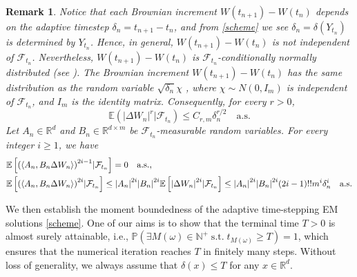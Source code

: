 \documentclass[preprint,12pt,compress]{elsarticle}
\newtheorem{remark}[theorem]{Remark}
\begin{document}
\begin{remark}   \label{remark-steps}
	Notice that each Brownian increment $W({t_{n + 1}}) - W({t_n})$ depends on the adaptive timestep $\delta_n = {t_{n + 1}} - {t_n}$, and from \eqref{scheme} we see ${\delta _n} = {\delta }({Y_{t_n}})$ is determined by $Y_{t_n}$. Hence, in general, $W({t_{n + 1}}) - W({t_n})$ is not independent of $\mathcal{F}_{t_n}$. Nevertheless, $W(t_{n+1}) - W(t_n)$ is $\mathcal{F}_{t_n}$-conditionally normally distributed (see \cite[Remark 2.2]{kelly2018adaptive}). The Brownian increment $W(t_{n+1}) -W(t_n)$ has the same distribution as the random variable $\sqrt{\delta_n} \chi$ \cite{botija2024explicit}, where $\chi  \sim N(0,{I_{m}})$ is independent of $\mathcal{F}_{t_n}$, and $I_{m}$ is the identity matrix. Consequently, for every $r > 0$, 
	\begin{equation*}
		\mathbb{E}\left( {{{\left| {\Delta {W_n}} \right|}^r}|{\mathcal{F}_{{t_n}}}} \right) \le {C_{r,m}}\delta _n^{r/2} \quad \text{a.s.}
	\end{equation*}
	Let $A_n \in \mathbb{R}^{d}$ and $B_n \in \mathbb{R}^{d \times m}$ be $\mathcal{F}_{t_n}$-measurable random variables. For every integer $i \ge 1$, we have
	\begin{equation} \label{kl7}
		\begin{split}
			&\mathbb{E}\left[ {{{\left( {\left\langle {A_n,B_n \Delta {W_n}} \right\rangle } \right)}^{2i - 1}}|{{\cal F}_{{t_n}}}} \right] = 0 \quad \text{a.s.}, \\
			&\mathbb{E}\left[ {{{\left( {\left\langle {A_n,B_n \Delta {W_n}} \right\rangle } \right)}^{2i}}|{{\cal F}_{{t_n}}}} \right] \le {\left| A_n \right|^{2i}}{\left| B_n \right|^{2i}}\mathbb{E}\left[ {{{\left| {\Delta {W_n}} \right|}^{2i}}|{{\cal F}_{{t_n}}}} \right]  \le {\left| A_n \right|^{2i}}{\left| B_n \right|^{2i}}(2i - 1)!!{m^i}\delta _n^i \quad \text{a.s.}
		\end{split}
	\end{equation}	
\end{remark}


We then establish the moment boundedness of the adaptive time-stepping EM solutions \eqref{scheme}.
One of our aims is to show that the terminal time $T > 0$ is almost surely attainable, i.e., $\mathbb{P}(\exists M(\omega ) \in \mathbb{N}^+ \; \text{s.t.} \; {t_{M(\omega )}} \ge T) = 1$, which ensures that the numerical iteration reaches $T$ in finitely many steps. Without loss of generality, we always assume that $\delta(x) \le T$ for any $x \in \mathbb{R}^d$.
\end{document}
